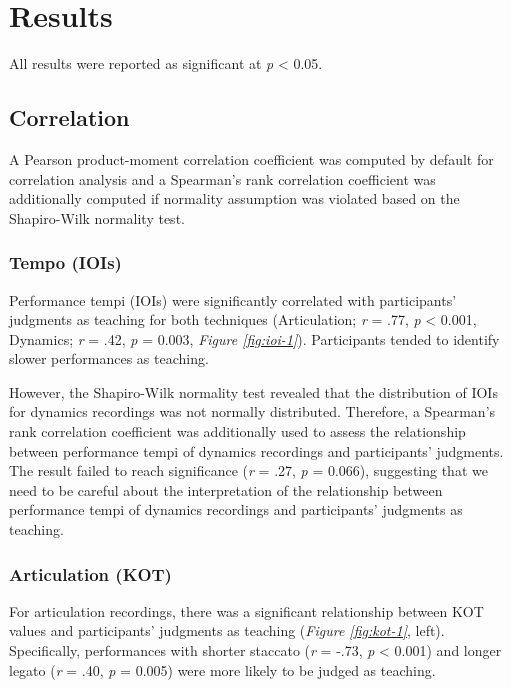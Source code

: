 \documentclass[
  man,floatsintext]{apa6}
\begin{document}
\clearpage

\hypertarget{results}{%
\section{Results}\label{results}}

All results were reported as significant at \emph{p} \textless{} 0.05.

\hypertarget{correlation}{%
\subsection{Correlation}\label{correlation}}

A Pearson product-moment correlation coefficient was computed by default for correlation analysis and a Spearman's rank correlation coefficient was additionally computed if normality assumption was violated based on the Shapiro-Wilk normality test.

\hypertarget{tempo-iois}{%
\subsubsection{Tempo (IOIs)}\label{tempo-iois}}

Performance tempi (IOIs) were significantly correlated with participants' judgments as teaching for both techniques (Articulation; \emph{r} = .77, \emph{p} \textless{} 0.001, Dynamics; \emph{r} = .42, \emph{p} = 0.003, \emph{Figure \ref{fig:ioi-1}}). Participants tended to identify slower performances as teaching.

However, the Shapiro-Wilk normality test revealed that the distribution of IOIs for dynamics recordings was not normally distributed. Therefore, a Spearman's rank correlation coefficient was additionally used to assess the relationship between performance tempi of dynamics recordings and participants' judgments. The result failed to reach significance (\emph{r} = .27, \emph{p} = 0.066), suggesting that we need to be careful about the interpretation of the relationship between performance tempi of dynamics recordings and participants' judgments as teaching.

\hypertarget{articulation-kot}{%
\subsubsection{Articulation (KOT)}\label{articulation-kot}}

For articulation recordings, there was a significant relationship between KOT values and participants' judgments as teaching (\emph{Figure \ref{fig:kot-1}}, left). Specifically, performances with shorter staccato (\emph{r} = -.73, \emph{p} \textless{} 0.001) and longer legato (\emph{r} = .40, \emph{p} = 0.005) were more likely to be judged as teaching.
\end{document}

